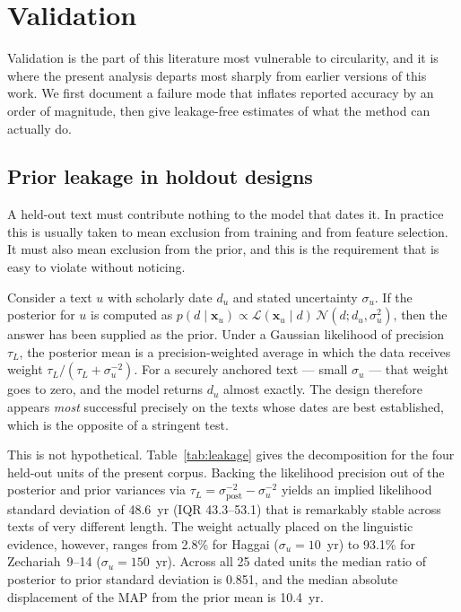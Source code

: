 \section*{Validation}
\label{sec:validation}

Validation is the part of this literature most vulnerable to circularity,
and it is where the present analysis departs most sharply from earlier
versions of this work.  We first document a failure mode that inflates
reported accuracy by an order of magnitude, then give leakage-free
estimates of what the method can actually do.

\subsection*{Prior leakage in holdout designs}

A held-out text must contribute nothing to the model that dates it.  In
practice this is usually taken to mean exclusion from training and from
feature selection.  It must also mean exclusion from the prior, and this is
the requirement that is easy to violate without noticing.

Consider a text $u$ with scholarly date $d_u$ and stated uncertainty
$\sigma_u$.  If the posterior for $u$ is computed as
$p(d \mid \mathbf{x}_u) \propto \mathcal{L}(\mathbf{x}_u \mid d)\,
\mathcal{N}(d; d_u, \sigma_u^2)$, then the answer has been supplied as the
prior.  Under a Gaussian likelihood of precision $\tau_L$, the posterior
mean is a precision-weighted average in which the data receives weight
$\tau_L / (\tau_L + \sigma_u^{-2})$.  For a securely anchored text ---
small $\sigma_u$ --- that weight goes to zero, and the model returns
$d_u$ almost exactly.  The design therefore appears \emph{most} successful
precisely on the texts whose dates are best established, which is the
opposite of a stringent test.

This is not hypothetical.  Table~\ref{tab:leakage} gives the decomposition
for the four held-out units of the present corpus.  Backing the likelihood
precision out of the posterior and prior variances via
$\tau_L = \sigma_{\text{post}}^{-2} - \sigma_u^{-2}$ yields an implied
likelihood standard deviation of 48.6~yr (IQR 43.3--53.1) that is
remarkably stable across texts of very different length.  The weight
actually placed on the linguistic evidence, however, ranges from 2.8\% for
Haggai ($\sigma_u = 10$~yr) to 93.1\% for Zechariah~9--14
($\sigma_u = 150$~yr).  Across all 25 dated units the median ratio of
posterior to prior standard deviation is 0.851, and the median absolute
displacement of the MAP from the prior mean is 10.4~yr.

